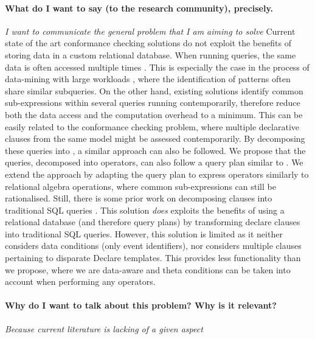 \paragraph*{What do I want to say (to the research community), precisely.} \textit{I want to communicate the general problem that I am aiming to solve} 
Current state of the art conformance checking solutions do not exploit the benefits of storing data in a custom relational database. When running queries, the same data is often accessed multiple times \cite{BurattinMS16,bpm21}. This is especially the case in the process of data-mining with large workloads \cite{SchonigRCJM16}, where the identification of patterns often share similar subqueries. On the other hand, existing solutions \cite{BellatrecheKB21} identify common sub-expressions within several queries running contemporarily, therefore reduce both the data access and the computation overhead to a minimum. This can be easily related to the conformance checking problem, where multiple declarative clauses from the same model might be assessed contemporarily. By decomposing these queries into \LTLf, a similar approach can also be followed. We propose that the queries, decomposed into \LTLf operators, can also follow a query plan similar to \cite{BellatrecheKB21}. We extend the approach by adapting the query plan to express \LTLf operators similarly to relational algebra operations, where common sub-expressions can still be rationalised. Still, there is some prior work on decomposing clauses into traditional SQL queries \cite{SchonigRCJM16}. This solution \emph{does} exploits the benefits of using a relational database (and therefore query plans) by transforming declare clauses into traditional SQL queries. However, this solution is limited as it neither considers data conditions (only event identifiers), nor considers multiple clauses pertaining to disparate Declare templates. This provides less functionality than we propose, where we are data-aware and theta conditions can be taken into account when performing any operators.

\paragraph*{Why do I want to talk about this problem? Why is it relevant?} \textit{Because current literature is lacking of a given aspect} 



